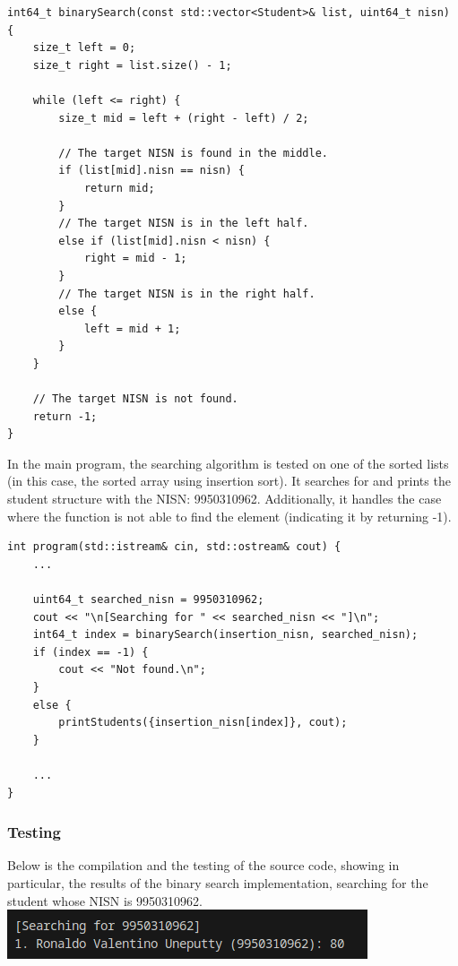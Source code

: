 \documentclass[12pt]{article}
\begin{document}
\begin{verbatim}
int64_t binarySearch(const std::vector<Student>& list, uint64_t nisn) {
    size_t left = 0;
    size_t right = list.size() - 1;

    while (left <= right) {
        size_t mid = left + (right - left) / 2;

        // The target NISN is found in the middle.
        if (list[mid].nisn == nisn) {
            return mid;
        }
        // The target NISN is in the left half.
        else if (list[mid].nisn < nisn) {
            right = mid - 1;
        }
        // The target NISN is in the right half.
        else {
            left = mid + 1;
        }
    }

    // The target NISN is not found.
    return -1;
}
\end{verbatim}

In the main program, the searching algorithm is tested on one of the sorted lists (in this case, the sorted array using insertion sort). It searches for and prints the student structure with the NISN: 9950310962. Additionally, it handles the case where the function is not able to find the element (indicating it by returning -1).

\begin{verbatim}
int program(std::istream& cin, std::ostream& cout) {
    ...

    uint64_t searched_nisn = 9950310962;
    cout << "\n[Searching for " << searched_nisn << "]\n";
    int64_t index = binarySearch(insertion_nisn, searched_nisn);
    if (index == -1) {
        cout << "Not found.\n";
    }
    else {
        printStudents({insertion_nisn[index]}, cout);
    }

    ...
}
\end{verbatim}

\subsubsection{Testing}
Below is the compilation and the testing of the source code, showing in particular, the results of the binary search implementation, searching for the student whose NISN is 9950310962.
\newline\includegraphics[width=\textwidth]{01_sort_search_binary}
\end{document}

